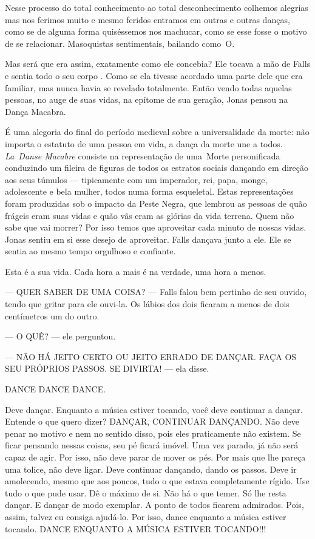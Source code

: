 Nesse processo do total conhecimento ao total desconhecimento\mudanca{,} colhemos alegrias\mudanca{,} mas nos ferimos muito e\mudanca{,} mesmo feridos\mudanca{,} entramos em outras e outras danças, como se de alguma forma quiséssemos nos machucar, como se esse fosse o motivo de se relacionar. Masoquistas sentimentais, bailando como~O.

Mas será que era assim, exatamente como ele concebia? Ele tocava a mão de Falls e sentia todo o seu corpo . Como se ela tivesse acordado uma parte dele que era familiar, mas nunca havia se revelado totalmente. Então\mudanca{,} vendo todas aquelas pessoas, no auge de suas vidas, na epítome de sua geração, Jonas pensou na Dança Macabra.

É uma alegoria do final do período medieval sobre a universalidade da morte: não importa o estatuto de uma pessoa em vida, a dança da morte une a todos. \emph{La~Danse Macabre} consiste na representação de uma~Morte personificada\mudanca{,} conduzindo um fileira de figuras de todos os estratos sociais\mudanca{,} dançando em direção aos seus túmulos --- tipicamente com um imperador, rei, papa, monge, adolescente e bela mulher, todos numa forma esqueletal. Estas representações foram produzidas sob o impacto da Peste Negra, que lembrou as pessoas de quão frágeis eram suas vidas e quão vãs eram as glórias da vida terrena. Quem não sabe que vai morrer? Por isso temos que aproveitar cada minuto de nossas vidas. Jonas sentiu em si esse desejo de aproveitar. Falls dançava junto a ele. Ele se sentia ao mesmo tempo orgulhoso e confiante.

Esta é a sua vida. Cada hora a mais é na verdade, uma hora a menos.

--- QUER SABER DE UMA COISA? --- Falls falou bem pertinho de seu ouvido, tendo que gritar para ele ouvi-la. Os lábios dos dois ficaram a menos de dois centímetros um do outro.

--- O QUÊ? --- ele perguntou.

--- NÃO HÁ JEITO CERTO OU JEITO ERRADO DE DANÇAR. FAÇA OS SEU PRÓPRIOS PASSOS. SE DIVIRTA! --- ela disse.

DANCE DANCE DANCE.

Deve dançar. Enquanto a música estiver tocando, você deve continuar a dançar. Entende o que quero dizer? DANÇAR, CONTINUAR DANÇANDO. Não deve penar no motivo e nem no sentido disso, pois eles praticamente não existem. Se ficar pensando nessas coisas, seu pé ficará imóvel. Uma vez parado, já não será capaz de agir. Por isso, não deve parar de mover os pés. Por mais que lhe pareça uma tolice, não deve ligar. Deve continuar dançando, dando os passos. Deve ir amolecendo, mesmo que aos poucos, tudo o que estava completamente rígido. Use tudo o que pude usar. Dê o máximo de si. Não há o que temer. Só lhe resta dançar. E dançar de modo exemplar. A ponto de todos ficarem admirados. Pois, assim, talvez eu consiga ajudá-lo. Por isso, dance enquanto a música estiver tocando. DANCE ENQUANTO A MÚSICA ESTIVER TOCANDO!!!

